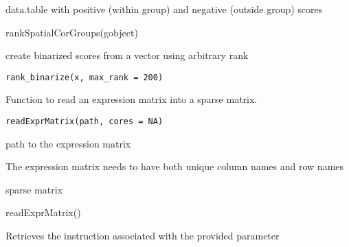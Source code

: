 \documentclass[a4paper]{book}
\begin{document}
%
\begin{Value}
data.table with positive (within group) and negative (outside group) scores
\end{Value}
%
\begin{Examples}
\begin{ExampleCode}
    rankSpatialCorGroups(gobject)
\end{ExampleCode}
\end{Examples}
%
\begin{Description}\relax
create binarized scores from a vector using arbitrary rank
\end{Description}
%
\begin{Usage}
\begin{verbatim}
rank_binarize(x, max_rank = 200)
\end{verbatim}
\end{Usage}
%
\begin{Description}\relax
Function to read an expression matrix into a sparse matrix.
\end{Description}
%
\begin{Usage}
\begin{verbatim}
readExprMatrix(path, cores = NA)
\end{verbatim}
\end{Usage}
%
\begin{Arguments}
\begin{ldescription}
\item[\code{path}] path to the expression matrix
\end{ldescription}
\end{Arguments}
%
\begin{Details}\relax
The expression matrix needs to have both unique column names and row names
\end{Details}
%
\begin{Value}
sparse matrix
\end{Value}
%
\begin{Examples}
\begin{ExampleCode}
    readExprMatrix()
\end{ExampleCode}
\end{Examples}
%
\begin{Description}\relax
Retrieves the instruction associated with the provided parameter
\end{Description}
\end{document}
